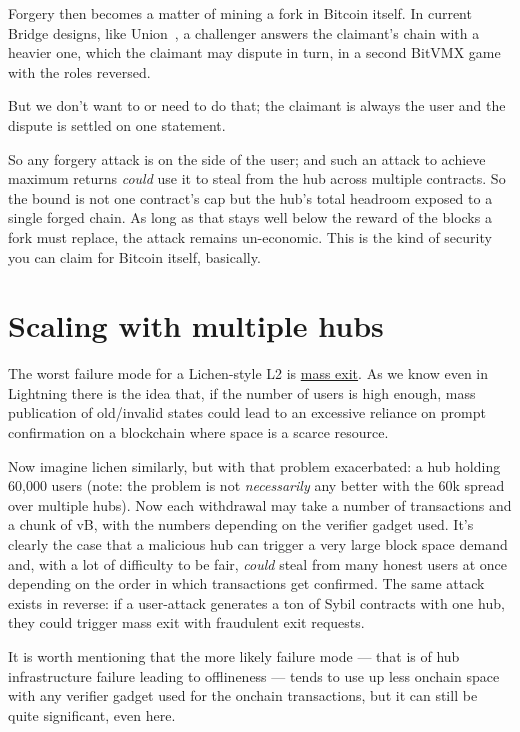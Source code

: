 \documentclass[11pt]{article}
\begin{document}
Forgery then becomes a matter of mining a fork in Bitcoin itself. In current Bridge designs, like Union~\cite{union}, a challenger answers the claimant's chain with a
heavier one, which the claimant may dispute in turn, in a second BitVMX
game with the roles reversed.

But we don't want to or need to do that; the claimant is always the user and the dispute is settled on one statement.

So any forgery attack is on the side of the user; and such an attack to achieve maximum returns \emph{could} use it to steal from the hub across multiple contracts.
So the bound is not one contract's cap but
the hub's total headroom exposed to a single forged chain. As long as
that stays well below the reward of the blocks a fork must replace, the attack remains un-economic. This is the kind of security you can claim for Bitcoin itself, basically.

\section{Scaling with multiple hubs}
\label{sec:multihub}

The worst failure mode for a Lichen-style L2 is \underline{mass exit}. As we know even in Lightning there is the idea that, if the number of users is high enough, mass publication of old/invalid states could lead to an excessive reliance on prompt confirmation on a blockchain where space is a scarce resource.

Now imagine lichen similarly, but with that problem exacerbated: a hub holding 60,000 users (note: the problem is not \emph{necessarily} any better with the 60k spread over multiple hubs). Now each withdrawal may take a number of transactions and a chunk of vB, with the numbers depending on the verifier gadget used. It's clearly the case that a malicious hub can trigger a very large block space demand and, with a lot of difficulty to be fair, \emph{could} steal from many honest users at once depending on the order in which transactions get confirmed. The same attack exists in reverse: if a user-attack generates a ton of Sybil contracts with one hub, they could trigger mass exit with fraudulent exit requests.

It is worth mentioning that the more likely failure mode --- that is of hub infrastructure failure leading to offlineness --- tends to use up less onchain space with any verifier gadget used for the onchain transactions, but it can still be quite significant, even here.
\end{document}
